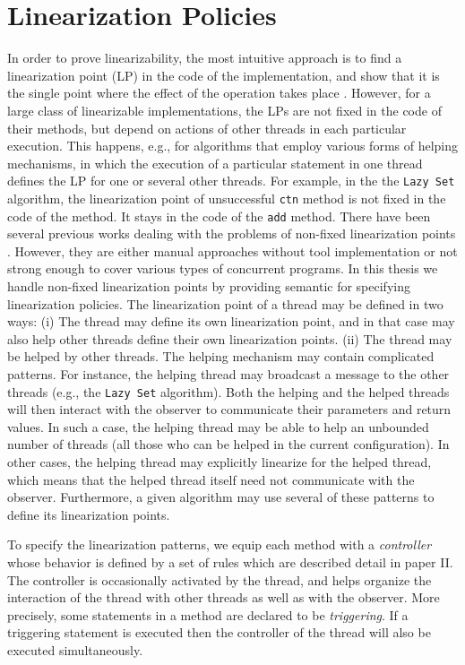\section*{Linearization Policies}
\label{controllers:subsection}
In order to prove linearizability, the most intuitive approach is to find a linearization point (LP) in the code of the implementation, and show that it is the single point where the effect of the operation takes place \cite{AHHR:integrated:rep,BLMRS:cav08,Vafeiadis}. However, for a large class of linearizable implementations,
the LPs are not fixed in the code of their methods, but depend on actions
of other threads in each particular execution. This happens, e.g., for algorithms that
employ various forms of helping mechanisms, in which the execution of a particular
statement in one thread defines the LP for one or several other threads. For example, in the the {\tt Lazy Set} algorithm, the linearization point of unsuccessful {\tt ctn} method is not fixed in the code of the method. It stays in the code of the {\tt add} method. There have been several previous works dealing with the problems of non-fixed linearization points \cite{Poling,Colvin:Lazy-List,CGLM:cav06,SWD:cav12,Derrick:fm14,SDW:tcl14,Vafeiadis:cav10,Vafeiadis:Aspect}. However, they are either manual approaches without tool implementation or not strong enough to cover various types of concurrent programs. In this thesis we handle non-fixed linearization points by providing semantic for specifying linearization policies. The linearization point of a thread may be defined in two ways:
(i) The thread may define its own linearization point,
and in that case may also help other threads define their 
own linearization points.
(ii) The thread may be helped by other threads.
%
The helping mechanism may contain complicated patterns.
%
For instance, the helping thread may broadcast a message to the other threads
(e.g., the {\tt Lazy Set} algorithm).
%
Both the helping and the helped threads will then interact with the observer to
communicate their parameters and return values.
%
In such a case, the helping thread may be able to help an unbounded number
of threads (all those who can be helped in the current configuration).
%
In other cases, 
the helping thread may explicitly 
linearize for the helped thread, which means that 
the helped thread itself need not communicate with the observer.
%
%
Furthermore, a given algorithm may use several of these patterns to 
define its linearization points.
%
 

To specify the linearization patterns, we equip each method with a
{\it controller} whose behavior is defined by a set of rules which are described detail in paper II.
%
The controller is occasionally activated by the thread,
and helps organize the interaction  
of the thread with other threads as well as with the observer.
%
More precisely, some 
statements in a  method are declared to be {\it triggering}. If a triggering statement is executed then 
the controller of the thread will also be executed simultaneously.  

